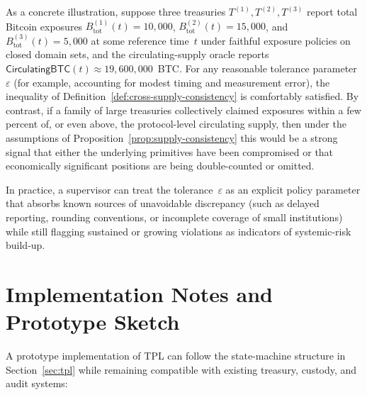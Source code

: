 \documentclass[11pt]{article}
\begin{document}
As a concrete illustration, suppose three treasuries $T^{(1)},T^{(2)},T^{(3)}$ report total Bitcoin exposures
$B_{\mathrm{tot}}^{(1)}(t)=10{,}000$, $B_{\mathrm{tot}}^{(2)}(t)=15{,}000$, and $B_{\mathrm{tot}}^{(3)}(t)=5{,}000$ at some
reference time~$t$ under faithful exposure policies on closed domain sets, and the circulating-supply oracle reports
$\mathsf{CirculatingBTC}(t) \approx 19{,}600{,}000$~BTC. For any reasonable tolerance parameter $\varepsilon$ (for example,
accounting for modest timing and measurement error), the inequality of Definition~\ref{def:cross-supply-consistency}
is comfortably satisfied. By contrast, if a family of large treasuries collectively claimed exposures within a few
percent of, or even above, the protocol-level circulating supply, then under the assumptions of
Proposition~\ref{prop:supply-consistency} this would be a strong signal that either the underlying primitives have been
compromised or that economically significant positions are being double-counted or omitted.

In practice, a supervisor can treat the tolerance~$\varepsilon$ as an explicit policy parameter that absorbs known
sources of unavoidable discrepancy (such as delayed reporting, rounding conventions, or incomplete coverage of small
institutions) while still flagging sustained or growing violations as indicators of systemic-risk build-up.

\section{Implementation Notes and Prototype Sketch}
\label{app:prototype}

A prototype implementation of TPL can follow the state-machine structure in Section~\ref{sec:tpl} while remaining
compatible with existing treasury, custody, and audit systems:
\end{document}
